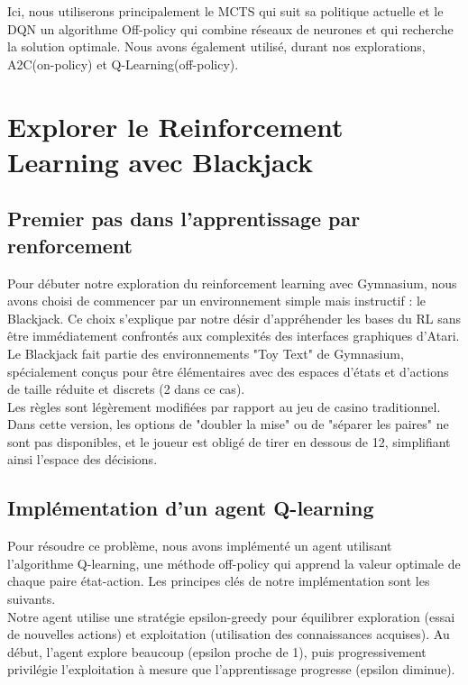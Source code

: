 \documentclass{article}
\begin{document}
Ici, nous utiliserons principalement le MCTS qui suit sa politique actuelle et le DQN un algorithme Off-policy qui combine réseaux de neurones et qui recherche la solution optimale. Nous avons également utilisé, durant nos explorations, A2C(on-policy) et Q-Learning(off-policy).

\clearpage

\section{Explorer le Reinforcement Learning avec Blackjack}

\subsection{Premier pas dans l'apprentissage par renforcement}

\quad Pour débuter notre exploration du reinforcement learning avec Gymnasium, nous avons choisi de commencer par un environnement simple mais instructif : le Blackjack. Ce choix s'explique par notre désir d'appréhender les bases du RL sans être immédiatement confrontés aux complexités des interfaces graphiques d'Atari. Le Blackjack fait partie des environnements "Toy Text" de Gymnasium, spécialement conçus pour être élémentaires avec des espaces d'états et d'actions de taille réduite et discrets (2 dans ce cas).\\

Les règles sont légèrement modifiées par rapport au jeu de casino traditionnel. Dans cette version, les options de "doubler la mise" ou de "séparer les paires" ne sont pas disponibles, et le joueur est obligé de tirer en dessous de 12, simplifiant ainsi l'espace des décisions.

\subsection{Implémentation d'un agent Q-learning}

\quad Pour résoudre ce problème, nous avons implémenté un agent utilisant l'algorithme Q-learning, une méthode off-policy qui apprend la valeur optimale de chaque paire état-action. Les principes clés de notre implémentation sont les suivants.\\

Notre agent utilise une stratégie epsilon-greedy pour équilibrer exploration (essai de nouvelles actions) et exploitation (utilisation des connaissances acquises). Au début, l'agent explore beaucoup (epsilon proche de 1), puis progressivement privilégie l'exploitation à mesure que l'apprentissage progresse (epsilon diminue).
\end{document}
